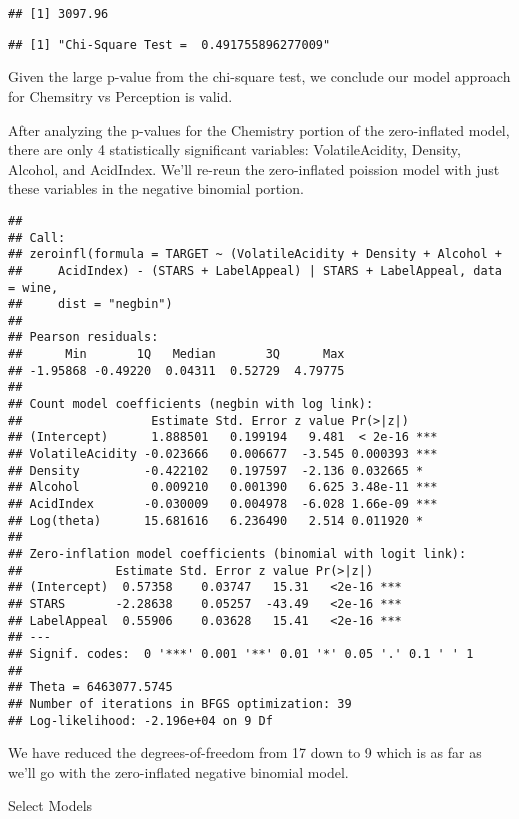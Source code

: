 \documentclass[]{article}
\begin{document}
\begin{verbatim}
## [1] 3097.96
\end{verbatim}

\begin{verbatim}
## [1] "Chi-Square Test =  0.491755896277009"
\end{verbatim}

Given the large p-value from the chi-square test, we conclude our model
approach for Chemsitry vs Perception is valid.

After analyzing the p-values for the Chemistry portion of the
zero-inflated model, there are only 4 statistically significant
variables: VolatileAcidity, Density, Alcohol, and AcidIndex. We'll
re-reun the zero-inflated poission model with just these variables in
the negative binomial portion.

\begin{verbatim}
## 
## Call:
## zeroinfl(formula = TARGET ~ (VolatileAcidity + Density + Alcohol + 
##     AcidIndex) - (STARS + LabelAppeal) | STARS + LabelAppeal, data = wine, 
##     dist = "negbin")
## 
## Pearson residuals:
##      Min       1Q   Median       3Q      Max 
## -1.95868 -0.49220  0.04311  0.52729  4.79775 
## 
## Count model coefficients (negbin with log link):
##                  Estimate Std. Error z value Pr(>|z|)    
## (Intercept)      1.888501   0.199194   9.481  < 2e-16 ***
## VolatileAcidity -0.023666   0.006677  -3.545 0.000393 ***
## Density         -0.422102   0.197597  -2.136 0.032665 *  
## Alcohol          0.009210   0.001390   6.625 3.48e-11 ***
## AcidIndex       -0.030009   0.004978  -6.028 1.66e-09 ***
## Log(theta)      15.681616   6.236490   2.514 0.011920 *  
## 
## Zero-inflation model coefficients (binomial with logit link):
##             Estimate Std. Error z value Pr(>|z|)    
## (Intercept)  0.57358    0.03747   15.31   <2e-16 ***
## STARS       -2.28638    0.05257  -43.49   <2e-16 ***
## LabelAppeal  0.55906    0.03628   15.41   <2e-16 ***
## ---
## Signif. codes:  0 '***' 0.001 '**' 0.01 '*' 0.05 '.' 0.1 ' ' 1 
## 
## Theta = 6463077.5745 
## Number of iterations in BFGS optimization: 39 
## Log-likelihood: -2.196e+04 on 9 Df
\end{verbatim}

We have reduced the degrees-of-freedom from 17 down to 9 which is as far
as we'll go with the zero-inflated negative binomial model.

\begin{center}
{\huge Select Models}
\end{center}
\end{document}
